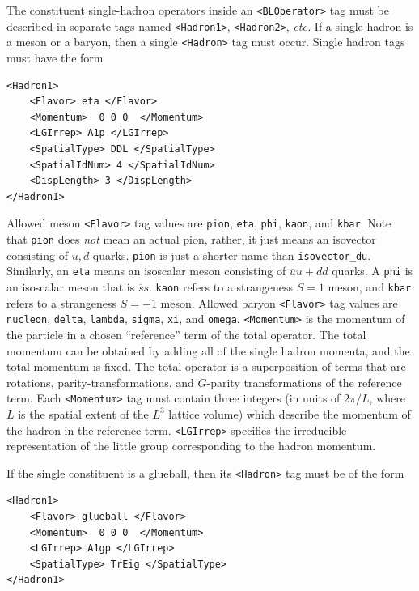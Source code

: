 \documentclass[12pt]{article}
\newcommand{\vb}{\texttt}
\begin{document}
The constituent single-hadron operators inside an \vb{<BLOperator>} tag
must be described in
separate tags named \vb{<Hadron1>}, \vb{<Hadron2>}, \textit{etc.}  If a single hadron
is a meson or a baryon, then a single \vb{<Hadron>} tag must occur.
Single hadron tags must have the form
\begin{verbatim}
<Hadron1>
    <Flavor> eta </Flavor>
    <Momentum>  0 0 0  </Momentum>
    <LGIrrep> A1p </LGIrrep>
    <SpatialType> DDL </SpatialType>
    <SpatialIdNum> 4 </SpatialIdNum>
    <DispLength> 3 </DispLength>
</Hadron1>
\end{verbatim}
Allowed meson \vb{<Flavor>} tag values are \vb{pion}, \vb{eta}, \vb{phi},
\vb{kaon}, and \vb{kbar}. Note that \vb{pion} does \textit{not} mean an actual
pion, rather, it just means an isovector consisting of $u,d$
quarks.  \vb{pion} is just a shorter name than \vb{isovector\_du}.
Similarly, an \vb{eta} means an isoscalar meson consisting of
$\overline{u}u+\overline{d}d$ quarks.  A \vb{phi} is an isoscalar meson
that is $\overline{s}s$.
\vb{kaon} refers to a strangeness $S=1$ meson, and \vb{kbar} refers
to a strangeness $S=-1$ meson. Allowed baryon \vb{<Flavor>} tag
values are \vb{nucleon}, \vb{delta}, \vb{lambda}, \vb{sigma}, \vb{xi}, and
\vb{omega}.  \vb{<Momentum>} is the momentum of the particle
in a chosen ``reference'' term of the total operator.  The
total momentum can be obtained by adding all of the single
hadron momenta, and the total momentum is fixed.  The total
operator is a superposition of terms that are rotations,
parity-transformations, and $G$-parity transformations of the
reference term. Each \vb{<Momentum>} tag must contain three
integers (in units of $2\pi/L$, where $L$ is the spatial extent of the
$L^3$ lattice volume) which describe the momentum
of the hadron in the reference term. \vb{<LGIrrep>} specifies the
irreducible representation of the little group corresponding
to the hadron momentum.

If the single constituent is a glueball, then its \vb{<Hadron>}
tag must be of the form
\begin{verbatim}
<Hadron1>
    <Flavor> glueball </Flavor>
    <Momentum>  0 0 0  </Momentum>
    <LGIrrep> A1gp </LGIrrep>
    <SpatialType> TrEig </SpatialType>
</Hadron1>
\end{verbatim}
\end{document}
